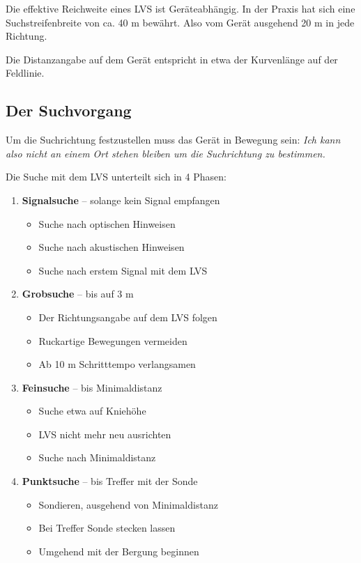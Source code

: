 \newcolumn

Die effektive Reichweite eines LVS ist Geräteabhängig. In der Praxis hat sich eine Suchstreifenbreite von ca. 40 m bewährt. Also vom Gerät ausgehend 20 m in jede Richtung.

Die Distanzangabe auf dem Gerät entspricht in etwa der Kurvenlänge auf der Feldlinie.

\subsection{Der Suchvorgang}

Um die Suchrichtung festzustellen muss das Gerät in Bewegung sein: \textit{Ich kann also nicht an einem Ort stehen bleiben um die Suchrichtung zu bestimmen.}

Die Suche mit dem LVS unterteilt sich in 4 Phasen:

\begin{enumerate}
  \item{
    \textbf{Signalsuche} -- solange kein Signal empfangen
    \begin{itemize}
      \item{Suche nach optischen Hinweisen}
      \item{Suche nach akustischen Hinweisen}
      \item{Suche nach erstem Signal mit dem LVS}
    \end{itemize}
  }
  \item{
    \textbf{Grobsuche} -- bis auf 3 m 
    \begin{itemize}
      \item{Der Richtungsangabe auf dem LVS folgen}
      \item{Ruckartige Bewegungen vermeiden}
      \item{Ab 10 m Schritttempo verlangsamen}
    \end{itemize}
  }
  \item{
    \textbf{Feinsuche} -- bis Minimaldistanz
    \begin{itemize}
      \item{Suche etwa auf Kniehöhe}
      \item{LVS nicht mehr neu ausrichten}
      \item{Suche nach Minimaldistanz}
    \end{itemize}
  }
  \item{
    \textbf{Punktsuche} -- bis Treffer mit der Sonde
    \begin{itemize}
      \item{Sondieren, ausgehend von Minimaldistanz}
      \item{Bei Treffer Sonde stecken lassen}
      \item{Umgehend mit der Bergung beginnen}
    \end{itemize}
  }
\end{enumerate}

